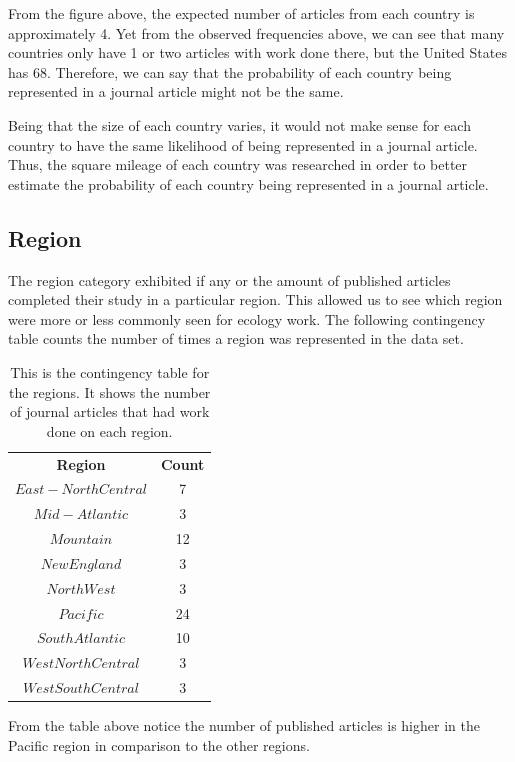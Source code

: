 \documentclass[12pt, letterpaper]{article}
\begin{document}
From the figure above, the expected number of articles from each country is approximately 4. Yet from the observed frequencies above, we can see that many countries only have 1 or two articles with work done there, but the United States has 68. Therefore, we can say that the probability of each country being represented in a journal article might not be the same.

Being that the size of each country varies, it would not make sense for each country to have the same likelihood of being represented in a journal article. Thus, the square mileage of each country was researched in order to better estimate the probability of each country being represented in a journal article. 

\pagebreak

\subsection{Region}
The region category exhibited if any or the amount of published articles completed their study in a particular region. This allowed us to see which region were more or less commonly seen for ecology work. The following contingency table counts the number of times a region was represented in the data set.
\begin{table}[h]
\begin{center}
\begin{tabular}{|c|c|}
\textbf{Region} & \textbf{Count}\\
$East-North Central$ & 7\\
$Mid-Atlantic$ &  3\\
$Mountain$ &  12\\
$New England$ & 3\\
$North West$ & 3\\
$Pacific$ & 24\\
$South Atlantic$ & 10\\
$West North Central$ & 3\\
$West South Central$ & 3\\
\end{tabular}
\end{center}
\caption{This is the contingency table for the regions. It shows the number of journal articles that had work done on each region.}
\label{fig: Region Contingency Table}
\end{table}
From the table above notice the number of published articles is higher in the Pacific region in comparison to the other regions.
\end{document}
